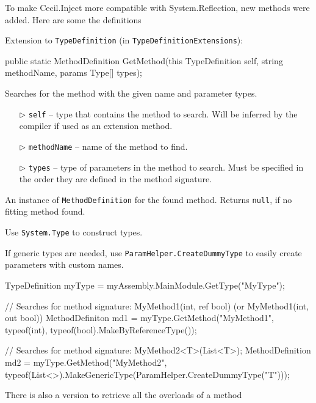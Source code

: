 \documentclass[a4paper,11pt]{article}
\newcommand{\CecilInject}{\textsc{C}{\scriptsize \sc ecil}.\textsc{I}{\scriptsize \sc nject}}
\begin{document}
To make \CecilInject{} more compatible with System.Reflection, new methods were added. Here are some the definitions

\begin{mdef}
Extension to \texttt{TypeDefinition} (in \texttt{TypeDefinitionExtensions}):
\begin{cs}
public static MethodDefinition GetMethod(this TypeDefinition self, 
                                         string methodName, 
                                         params Type[] types);
\end{cs}
Searches for the method with the given name and parameter types.

\begin{itemize}
\item[$\triangleright$] \texttt{self} -- type that contains the method to search. Will be inferred by the compiler if used as an extension method.
\item[$\triangleright$] \texttt{methodName} -- name of the method to find.
\item[$\triangleright$] \texttt{types} -- type of parameters in the method to search. Must be specified in the order they are defined in the method signature.
\end{itemize}

An instance of \texttt{MethodDefinition} for the found method. Returns \texttt{null}, if no fitting method found.

Use \texttt{System.Type} to construct types. 
\newline

If generic types are needed, use \texttt{ParamHelper.CreateDummyType} to easily create parameters with custom names.

\begin{cs}
TypeDefinition myType = myAssembly.MainModule.GetType("MyType");

// Searches for method signature: MyMethod1(int, ref bool) (or MyMethod1(int, out bool))
MethodDefiniton md1 = myType.GetMethod("MyMethod1", 
                                       typeof(int), 
                                       typeof(bool).MakeByReferenceType());

// Searches for method signature: MyMethod2<T>(List<T>);
MethodDefinition md2 = 
  myType.GetMethod("MyMethod2", 
     typeof(List<>).MakeGenericType(ParamHelper.CreateDummyType("T")));
\end{cs}
\end{mdef}
\newpage
There is also a version to retrieve all the overloads of a method
\end{document}
